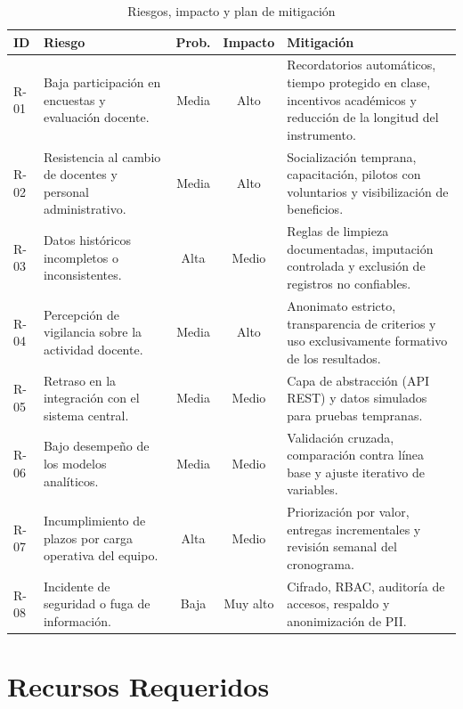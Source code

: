 \begin{table}[H]
\centering
\caption{Riesgos, impacto y plan de mitigación}
\label{tab:riesgos}
\small
\begin{tabularx}{\textwidth}{@{}p{1.2cm} X c c X@{}}
\toprule
\rowcolor{naranjaClaro}
\textbf{ID} & \textbf{Riesgo} & \textbf{Prob.} & \textbf{Impacto} & \textbf{Mitigación} \\
\midrule
R-01 & Baja participación en encuestas y evaluación docente. &
  Media & Alto &
  Recordatorios automáticos, tiempo protegido en clase, incentivos
  académicos y reducción de la longitud del instrumento. \\
R-02 & Resistencia al cambio de docentes y personal administrativo. &
  Media & Alto &
  Socialización temprana, capacitación, pilotos con voluntarios y
  visibilización de beneficios. \\
R-03 & Datos históricos incompletos o inconsistentes. &
  Alta & Medio &
  Reglas de limpieza documentadas, imputación controlada y exclusión de
  registros no confiables. \\
R-04 & Percepción de vigilancia sobre la actividad docente. &
  Media & Alto &
  Anonimato estricto, transparencia de criterios y uso exclusivamente
  formativo de los resultados. \\
R-05 & Retraso en la integración con el sistema central. &
  Media & Medio &
  Capa de abstracción (\ac{API} \ac{REST}) y datos simulados para pruebas
  tempranas. \\
R-06 & Bajo desempeño de los modelos analíticos. &
  Media & Medio &
  Validación cruzada, comparación contra línea base y ajuste iterativo
  de variables. \\
R-07 & Incumplimiento de plazos por carga operativa del equipo. &
  Alta & Medio &
  Priorización por valor, entregas incrementales y revisión semanal del
  cronograma. \\
R-08 & Incidente de seguridad o fuga de información. &
  Baja & Muy alto &
  Cifrado, \ac{RBAC}, auditoría de accesos, respaldo y anonimización de
  \ac{PII}. \\
\bottomrule
\end{tabularx}
\end{table}

\section{Recursos Requeridos}

